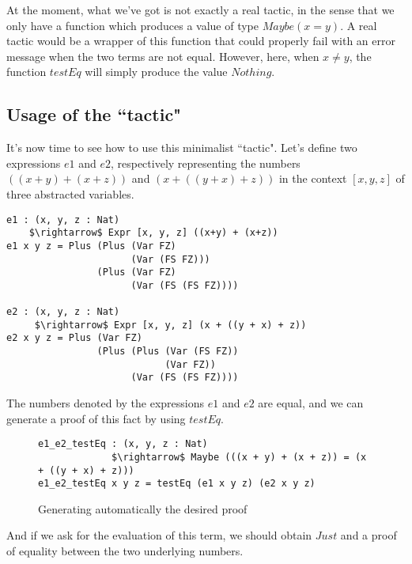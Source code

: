 At the moment, what we've got is not exactly a real tactic, in the sense that we only have a function which produces a value of type $Maybe (x = y)$. A real tactic would be a wrapper of this function that could properly fail with an error message when the two terms are not equal. However, here, when $x\ne y$, the function $testEq$ will simply produce the value $Nothing$. \\

\subsection{Usage of the ``tactic"}

It's now time to see how to use this minimalist ``tactic".
Let's define two expressions $e1$ and $e2$, respectively representing the numbers $((x + y) + (x + z))$ and $(x + ((y + x) + z))$ in the context $[x, y, z]$ of three abstracted variables.


\begin{lstlisting}
e1 : (x, y, z : Nat) 
    $\rightarrow$ Expr [x, y, z] ((x+y) + (x+z))
e1 x y z = Plus (Plus (Var FZ) 
                      (Var (FS FZ))) 
                (Plus (Var FZ) 
                      (Var (FS (FS FZ))))

e2 : (x, y, z : Nat) 
     $\rightarrow$ Expr [x, y, z] (x + ((y + x) + z))
e2 x y z = Plus (Var FZ) 
                (Plus (Plus (Var (FS FZ)) 
                            (Var FZ)) 
                      (Var (FS (FS FZ))))
\end{lstlisting}


The numbers denoted by the expressions $e1$ and $e2$ are equal, and we can generate a proof of this fact by using $testEq$.

\begin{figure}[H]
\figrule
\begin{center}
\begin{lstlisting}
e1_e2_testEq : (x, y, z : Nat) 
             $\rightarrow$ Maybe (((x + y) + (x + z)) = (x + ((y + x) + z)))
e1_e2_testEq x y z = testEq (e1 x y z) (e2 x y z)
\end{lstlisting}
\end{center}
\caption{Generating automatically the desired proof}
\label{e1_e2_testEq}
\figrule
\end{figure}


And if we ask for the evaluation of this term, we should obtain $Just$ and a proof of equality between the two underlying numbers.

